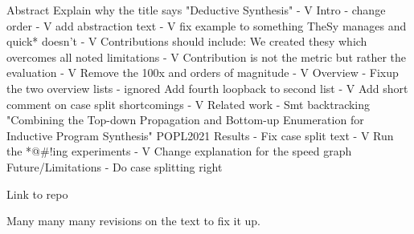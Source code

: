 Abstract
    Explain why the title says "Deductive Synthesis" - V
Intro - 
    change order - V
    add abstraction text - V
    fix example to something TheSy manages and quick* doesn't - V
    Contributions should include: We created thesy which overcomes all noted limitations - V
    Contribution is not the metric but rather the evaluation - V
    Remove the 100x and orders of magnitude - V
Overview -
    Fixup the two overview lists - ignored
    Add fourth loopback to second list - V
    Add short comment on case split shortcomings - V
Related work - 
    Smt backtracking
    "Combining the Top-down Propagation and Bottom-up Enumeration for Inductive Program Synthesis" POPL2021
Results - 
    Fix case split text - V 
    Run the *@#!ing experiments - V
    Change explanation for the speed graph
Future/Limitations - 
    Do case splitting right
    
Link to repo
    
Many many many revisions on the text to fix it up.